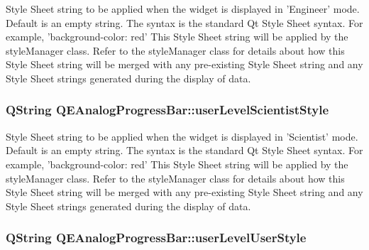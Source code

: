 \label{classQEAnalogProgressBar_a0f74beab0aaf83d08cef24458a80ef72}
Style Sheet string to be applied when the widget is displayed in 'Engineer' mode. Default is an empty string. The syntax is the standard Qt Style Sheet syntax. For example, 'background-\/color: red' This Style Sheet string will be applied by the styleManager class. Refer to the styleManager class for details about how this Style Sheet string will be merged with any pre-\/existing Style Sheet string and any Style Sheet strings generated during the display of data. \hypertarget{classQEAnalogProgressBar_a2df6688a176e6c3617cc8b23e2b93c8a}{
\subsubsection[{userLevelScientistStyle}]{\setlength{\rightskip}{0pt plus 5cm}QString QEAnalogProgressBar::userLevelScientistStyle}}
\label{classQEAnalogProgressBar_a2df6688a176e6c3617cc8b23e2b93c8a}
Style Sheet string to be applied when the widget is displayed in 'Scientist' mode. Default is an empty string. The syntax is the standard Qt Style Sheet syntax. For example, 'background-\/color: red' This Style Sheet string will be applied by the styleManager class. Refer to the styleManager class for details about how this Style Sheet string will be merged with any pre-\/existing Style Sheet string and any Style Sheet strings generated during the display of data. \hypertarget{classQEAnalogProgressBar_af1076f7c81d12f8138e63f1e9fd6acde}{
\subsubsection[{userLevelUserStyle}]{\setlength{\rightskip}{0pt plus 5cm}QString QEAnalogProgressBar::userLevelUserStyle}}
\label{classQEAnalogProgressBar_af1076f7c81d12f8138e63f1e9fd6acde}

